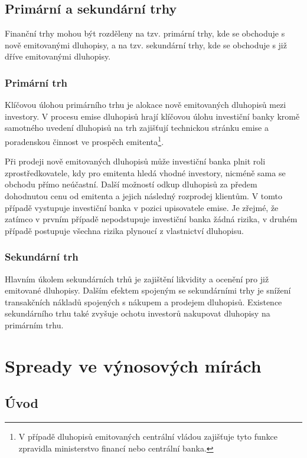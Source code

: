 \documentclass[a4paper]{book}
\begin{document}
\section{Primární a sekundární trhy}

Finanční trhy mohou být rozděleny na tzv. primární trhy, kde se obchoduje s nově emitovanými dluhopisy, a na tzv. sekundární trhy, kde se obchoduje s již dříve emitovanými dluhopisy.

\subsection{Primární trh}

Klíčovou úlohou primárního trhu je alokace nově emitovaných dluhopisů mezi investory. V procesu emise dluhopisů hrají  klíčovou úlohu investiční banky kromě samotného uvedení dluhopisů na trh zajišťují technickou stránku emise a poradenskou činnost ve prospěch emitenta\footnote{V případě dluhopisů emitovaných centrální vládou zajišťuje tyto funkce zpravidla ministerstvo financí nebo centrální banka.}.

Při prodeji nově emitovaných dluhopisů může investiční banka plnit roli zprostředkovatele, kdy pro emitenta hledá vhodné investory, nicméně sama se obchodu přímo neúčastní. Další možností odkup dluhopisů za předem dohodnutou cenu od emitenta a jejich následný rozprodej klientům. V tomto případě vystupuje investiční banka v pozici upisovatele emise. Je zřejmé, že zatímco v prvním případě nepodstupuje investiční banka žádná rizika, v druhém případě postupuje všechna rizika plynoucí z vlastnictví dluhopisu.

\subsection{Sekundární trh}

Hlavním úkolem sekundárních trhů je zajištění likvidity a ocenění pro již emitované dluhopisy. Dalším efektem spojeným se sekundárními trhy je snížení transakčních nákladů spojených s nákupem a prodejem dluhopisů. Existence sekundárního trhu také zvyšuje ochotu investorů nakupovat dluhopisy na primárním trhu.

\chapter{Spready ve výnosových mírách}

\section{Úvod}
\end{document}
